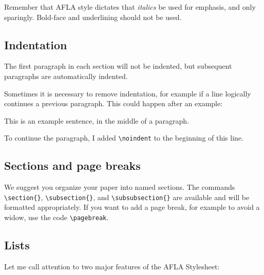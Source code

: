 \documentclass{afla}
\begin{document}
Remember that AFLA style dictates that \textit{italics} be used for emphasis, and only sparingly. Bold-face and underlining should not be used.

\subsection{Indentation}

The first paragraph in each section will not be indented, but subsequent paragraphs are automatically indented.

Sometimes it is necessary to remove indentation, for example if a line logically continues a previous paragraph. This could happen after an example:

\ex This is an example sentence, in the middle of a paragraph.
\xe
\

\noindent To continue the paragraph, I added \verb`\noindent` to the beginning of this line.

\subsection{Sections and page breaks}

We suggest you organize your paper into named sections. The commands \verb`\section{}`, \linebreak \verb`\subsection{}`, and \verb`\subsubsection{}` are available and will be formatted appropriately. If you want to add a page break, for example to avoid a widow, use the code \verb`\pagebreak`.%

\subsection{Lists}

Let me call attention to two major features of the AFLA Stylesheet:
\end{document}
